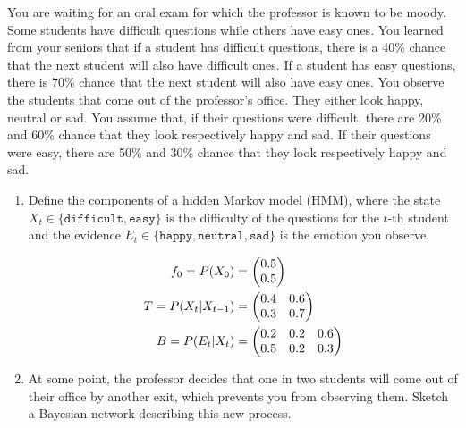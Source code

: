 \documentclass[11pt, a4paper]{article}
\begin{document}
You are waiting for an oral exam for which the professor is known to be moody. Some students have difficult questions while others have easy ones. You learned from your seniors that if a student has difficult questions, there is a 40\% chance that the next student will also have difficult ones. If a student has easy questions, there is 70\% chance that the next student will also have easy ones. You observe the students that come out of the professor's office. They either look happy, neutral or sad. You assume that, if their questions were difficult, there are 20\% and 60\% chance that they look respectively happy and sad. If their questions were easy, there are 50\% and 30\% chance that they look respectively happy and sad.

\begin{enumerate}
    \item Define the components of a hidden Markov model (HMM), where the state $X_t \in \{\texttt{difficult}, \texttt{easy}\}$ is the difficulty of the questions for the $t$-th student and the evidence $E_t \in \{\texttt{happy}, \texttt{neutral}, \texttt{sad}\}$ is the emotion you observe.
    \begin{solution}
        \begin{align*}
            f_0 = P(X_0) & = \begin{pmatrix}0.5 \\ 0.5\end{pmatrix} \\
            T = P(X_t | X_{t-1}) & = \begin{pmatrix}0.4 & 0.6 \\ 0.3 & 0.7\end{pmatrix} \\
            B = P(E_t | X_t) & = \begin{pmatrix}0.2 & 0.2 & 0.6 \\ 0.5 & 0.2 & 0.3\end{pmatrix}
        \end{align*}
    \end{solution}

    \item At some point, the professor decides that one in two students will come out of their office by another exit, which prevents you from observing them. Sketch a Bayesian network describing this new process.%

    \begin{solution}
    \begin{figure}[h]
        \centering
\end{figure}
\end{solution}
\end{enumerate}
\end{document}
